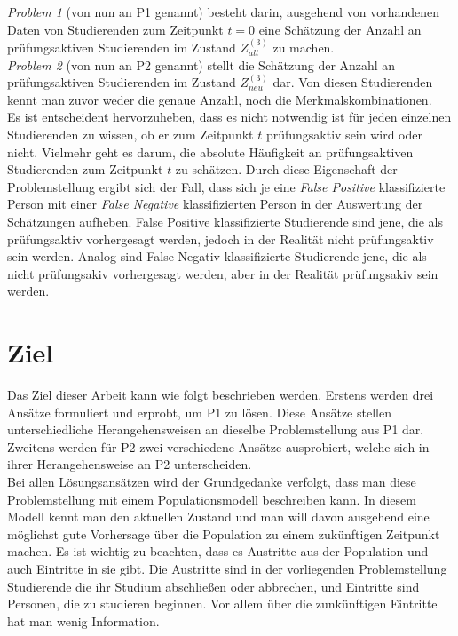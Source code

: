 \textit{Problem 1} (von nun an P1 genannt) besteht darin, ausgehend von vorhandenen Daten von Studierenden zum Zeitpunkt $t = 0$
eine Sch\"atzung der Anzahl an pr\"ufungsaktiven Studierenden im Zustand $Z_{alt}^{(3)}$ zu machen. \\

\textit{Problem 2} (von nun an P2 genannt) stellt die Sch\"atzung der Anzahl an pr\"ufungsaktiven Studierenden im Zustand $Z_{neu}^{(3)}$ dar. Von diesen
Studierenden kennt man zuvor weder die genaue Anzahl, noch die Merkmalskombinationen. \\


Es ist entscheident hervorzuheben, dass es nicht notwendig ist f\"ur jeden einzelnen Studierenden zu wissen, ob er
zum Zeitpunkt $t$  pr\"ufungsaktiv sein wird oder nicht. Vielmehr geht es darum, die absolute H\"aufigkeit an pr\"ufungsaktiven
Studierenden zum Zeitpunkt $t$ zu sch\"atzen. Durch diese Eigenschaft der Problemstellung ergibt sich der Fall,
dass sich je eine \textit{False Positive} klassifizierte Person mit einer
\textit{False Negative} klassifizierten Person in der Auswertung der Sch\"atzungen aufheben. False Positive klassifizierte Studierende sind jene, die
als pr\"ufungsaktiv vorhergesagt werden, jedoch in der Realit\"at nicht pr\"ufungsaktiv sein werden. Analog sind False Negativ klassifizierte Studierende jene, die
als nicht pr\"ufungsakiv  vorhergesagt werden, aber in der Realit\"at pr\"ufungsakiv sein werden.  \\









\section{Ziel}
Das Ziel dieser Arbeit kann wie folgt beschrieben werden. Erstens werden drei Ans\"atze formuliert und erprobt,
um P1 zu l\"osen. Diese Ans\"atze stellen unterschiedliche Herangehensweisen an dieselbe Problemstellung aus P1 dar.
Zweitens werden f\"ur P2 zwei verschiedene Ans\"atze ausprobiert, welche sich in ihrer Herangehensweise an P2 unterscheiden. \\


Bei allen L\"osungsans\"atzen wird der Grundgedanke verfolgt, dass man diese Problemstellung mit einem Populationsmodell beschreiben kann.
In diesem Modell kennt man den aktuellen Zustand und man will davon ausgehend eine m\"oglichst gute Vorhersage \"uber die Population zu einem zuk\"unftigen
Zeitpunkt machen. Es ist wichtig zu beachten, dass es Austritte aus der Population und auch Eintritte in sie gibt. Die Austritte sind in der vorliegenden Problemstellung
Studierende die ihr Studium abschlie{\ss}en oder abbrechen, und Eintritte sind Personen, die zu studieren beginnen. Vor allem \"uber die zunk\"unftigen Eintritte
hat man wenig Information. \\

